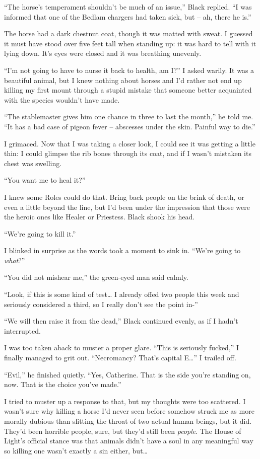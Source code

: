 \documentclass[12pt, openany]{book}
\begin{document}
“The horse’s temperament shouldn’t be much of an issue,” Black replied. “I was informed that one of the Bedlam chargers had taken sick, but – ah, there he is.”

The horse had a dark chestnut coat, though it was matted with sweat. I guessed it must have stood over five feet tall when standing up: it was hard to tell with it lying down. It’s eyes were closed and it was breathing unevenly.

“I’m not going to have to nurse it back to health, am I?” I asked warily. It was a beautiful animal, but I knew nothing about horses and I’d rather not end up killing my first mount through a stupid mistake that someone better acquainted with the species wouldn’t have made.

“The stablemaster gives him one chance in three to last the month,” he told me. “It has a bad case of pigeon fever – abscesses under the skin. Painful way to die.”

I grimaced. Now that I was taking a closer look, I could see it was getting a little thin: I could glimpse the rib bones through its coat, and if I wasn’t mistaken its chest was swelling.

“You want me to heal it?”

I knew some Roles could do that. Bring back people on the brink of death, or even a little beyond the line, but I’d been under the impression that those were the heroic ones like Healer or Priestess. Black shook his head.

“We’re going to kill it.”

I blinked in surprise as the words took a moment to sink in. “We’re going to \textit{what}?”

“You did not mishear me,” the green-eyed man said calmly.

“Look, if this is some kind of test… I already offed two people this week and seriously considered a third, so I really don’t see the point in-”

“We will then raise it from the dead,” Black continued evenly, as if I hadn’t interrupted.

I was too taken aback to muster a proper glare. “This is seriously fucked,” I finally managed to grit out. “Necromancy? That’s capital E…” I trailed off.

“Evil,” he finished quietly. “Yes, Catherine. That is the side you’re standing on, now. That is the choice you’ve made.”

I tried to muster up a response to that, but my thoughts were too scattered. I wasn’t sure why killing a horse I’d never seen before somehow struck me as more morally dubious than slitting the throat of two actual human beings, but it did. They’d been horrible people, sure, but they’d still been \textit{people}. The House of Light’s official stance was that animals didn’t have a soul in any meaningful way so killing one wasn’t exactly a sin either, but… 
\end{document}

